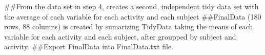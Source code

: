 \documentclass[
]{article}
\begin{document}
\#\#From the data set in step 4, creates a second, independent tidy data
set with the average of each variable for each activity and each subject
\#\#FinalData (180 rows, 88 columns) is created by sumarizing TidyData
taking the means of each variable for each activity and each subject,
after groupped by subject and activity. \#\#Export FinalData into
FinalData.txt file.
\end{document}
